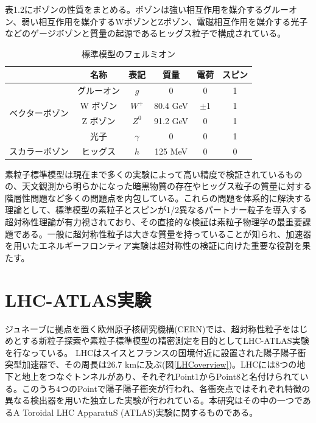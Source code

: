 表1.2にボゾンの性質をまとめる。ボゾンは強い相互作用を媒介するグルーオン、弱い相互作用を媒介するWボゾンとZボゾン、電磁相互作用を媒介する光子などのゲージボゾンと質量の起源であるヒッグス粒子で構成されている。

\begin{table}[]
    \centering
    \caption[標準模型のフェルミオン]{標準模型のフェルミオン}
    \label{tab:bozon}

    \begin{tabular}{cccccc}
    \hline
                                                                                           & 名称        & 表記           & 質量                 & 電荷   & スピン \\ 
    \hline\hline
    \multicolumn{1}{c|}{\multirow{4}{*}{ベクターボゾン}}  & グルーオン       & $g$            & 0            & 0 & 1 \\
    \multicolumn{1}{c|}{}                                            &   W ボゾン     & $W^{+}$            & 80.4 GeV            & $\pm$1 & 1 \\ 
    \multicolumn{1}{c|}{}                       & Z ボゾン      & $Z^{0}$           & 91.2 GeV            & 0 & 1 \\
    \multicolumn{1}{c|}{}                                            & 光子    & $\gamma$            & 0             & 0 & 1 \\
    \hline\hline
    \multicolumn{1}{c|}{\multirow{1}{*}{スカラーボゾン}}  & ヒッグス  & $h$    & 125 MeV     & 0    & 0 \\
    \hline
    \end{tabular}
\end{table}


素粒子標準模型は現在まで多くの実験によって高い精度で検証されているものの、天文観測から明らかになった暗黒物質の存在やヒッグス粒子の質量に対する階層性問題など多くの問題点を内包している。これらの問題を体系的に解決する理論として、標準模型の素粒子とスピンが1/2異なるパートナー粒子を導入する超対称性理論が有力視されており、その直接的な検証は素粒子物理学の最重要課題である。一般に超対称性粒子は大きな質量を持っていることが知られ、加速器を用いたエネルギーフロンティア実験は超対称性の検証に向けた重要な役割を果たす。
\section{LHC-ATLAS実験}
\label{sec_intro_atlas}

ジュネーブに拠点を置く欧州原子核研究機構(CERN)では、超対称性粒子をはじめとする新粒子探索や素粒子標準模型の精密測定を目的としてLHC-ATLAS実験を行なっている。
LHCはスイスとフランスの国境付近に設置された陽子陽子衝突型加速器で、その周長は26.7 kmに及ぶ(図\ref{LHCoverview})。LHCには8つの地下と地上をつなぐトンネルがあり、それぞれPoint1からPoint8と名付けられている。このうち4つのPointで陽子陽子衝突が行われ、各衝突点ではそれぞれ特徴の異なる検出器を用いた独立した実験が行われている。本研究はその中の一つであるA Toroidal LHC ApparatuS (ATLAS)実験に関するものである。

